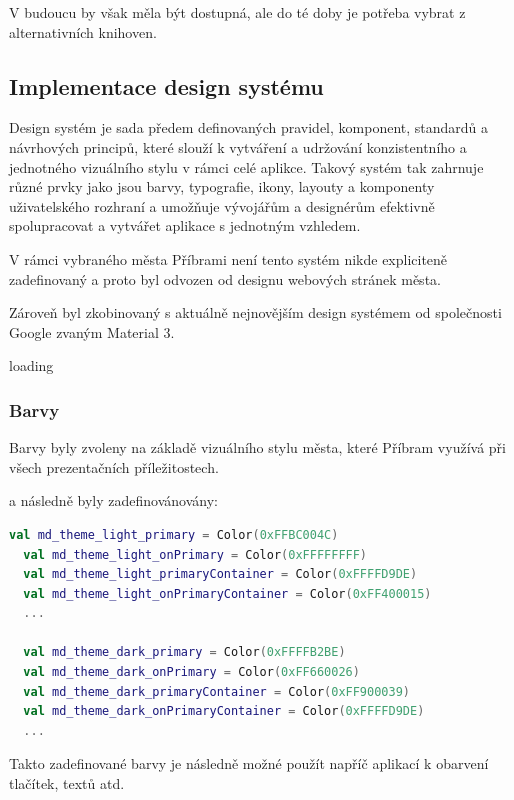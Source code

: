 V budoucu by však měla být dostupná, ale do té doby je potřeba vybrat z alternativních knihoven.



\subsection{Implementace design systému}
Design systém je sada předem definovaných pravidel, komponent, standardů a návrhových principů, které slouží k vytváření a udržování 
konzistentního a jednotného vizuálního stylu v rámci celé aplikce. Takový systém tak zahrnuje různé prvky jako jsou barvy, typografie, ikony,
layouty a komponenty uživatelského rozhraní a umožňuje vývojářům a designérům efektivně spolupracovat a vytvářet aplikace s jednotným 
vzhledem. 

V rámci vybraného města Příbrami není tento systém nikde expliciteně zadefinovaný a proto byl odvozen od designu webových stránek města.

Zároveň byl zkobinovaný s aktuálně nejnovějším design systémem od společnosti Google zvaným Material 3.


loading


\subsubsection{Barvy}
Barvy byly zvoleny na základě vizuálního stylu města, které Příbram využívá při všech prezentačních příležitostech.

a následně byly zadefinovánovány:

\begin{lstlisting}[caption={Zadefinování barev}, label={lst:ComposeCode}, language=Kotlin]
  val md_theme_light_primary = Color(0xFFBC004C)
  val md_theme_light_onPrimary = Color(0xFFFFFFFF)
  val md_theme_light_primaryContainer = Color(0xFFFFD9DE)
  val md_theme_light_onPrimaryContainer = Color(0xFF400015)
  ...

  val md_theme_dark_primary = Color(0xFFFFB2BE)
  val md_theme_dark_onPrimary = Color(0xFF660026)
  val md_theme_dark_primaryContainer = Color(0xFF900039)
  val md_theme_dark_onPrimaryContainer = Color(0xFFFFD9DE)
  ...
\end{lstlisting}

Takto zadefinované barvy je následně možné použít napříč aplikací k obarvení tlačítek, textů atd.

